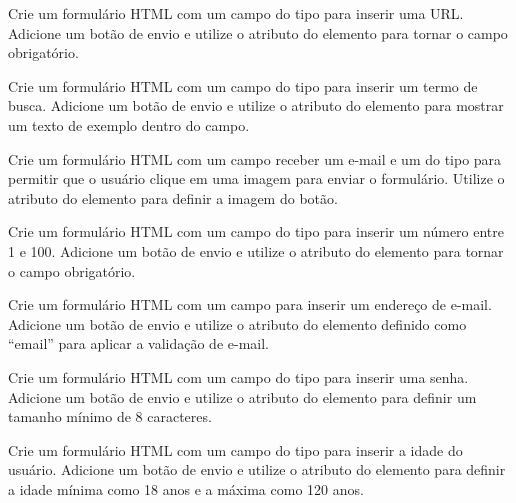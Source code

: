 \begin{exercise}
Crie um formulário HTML com um campo do tipo  para inserir uma URL. Adicione um botão de envio e utilize o atributo  do elemento  para tornar o campo obrigatório.
\end{exercise}

\begin{exercise}
Crie um formulário HTML com um campo do tipo  para inserir um termo de busca. Adicione um botão de envio e utilize o atributo  do elemento  para mostrar um texto de exemplo dentro do campo.
\end{exercise}

\begin{exercise}
Crie um formulário HTML com um campo receber um e-mail e um  do tipo  para permitir que o usuário clique em uma imagem para enviar o formulário. Utilize o atributo  do elemento para definir a imagem do botão.
\end{exercise}

\begin{exercise}
Crie um formulário HTML com um campo do tipo  para inserir um número entre 1 e 100. Adicione um botão de envio e utilize o atributo  do elemento  para tornar o campo obrigatório. 
\end{exercise}

\begin{exercise}
Crie um formulário HTML com um campo para inserir um endereço de e-mail. Adicione um botão de envio e utilize o atributo  do elemento  definido como ``email'' para aplicar a validação de e-mail.
\end{exercise}

\begin{exercise}
Crie um formulário HTML com um campo do tipo  para inserir uma senha. Adicione um botão de envio e utilize o atributo  do elemento  para definir um tamanho mínimo de 8 caracteres.
\end{exercise}

\begin{exercise}
Crie um formulário HTML com um campo do tipo  para inserir a idade do usuário. Adicione um botão de envio e utilize o atributo  do elemento  para definir a idade mínima como 18 anos e a máxima como 120 anos.
\end{exercise}

